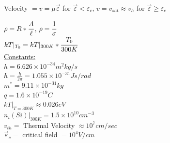\documentclass{article}
\newcommand\tab[1][1cm]{\hspace*{#1}}
\begin{document}
\begin{large}
	\noindent Velocity $= v = \mu \vec{\varepsilon}$ for $\vec{\varepsilon} < \varepsilon_c$, \tab 
	$v = v_{sat} \approx v_h$ for $\vec{\varepsilon} \geq \varepsilon_c$
	
	\noindent $\rho = R*\cfrac{A}{\ell}$, \tab $\rho = \cfrac{1}{\sigma}$\\
	
	\noindent $kT|_{T_0} = kT|_{300K} * \cfrac{T_0}{300K}$\\
	
	\noindent \underline{Constants:} \\
	$h = 6.626 \times 10^{-34} m^2 kg / s$\\
	$\hbar = \frac{h}{2\pi} = 1.055 \times 10^{-31} Js/rad$\\ 
	$m^* = 9.11 \times 10^{-31} kg$\\
	$q = 1.6 \times 10^{-19} C$\\
	$kT|_{T=300K} \approx 0.026eV$ \\
	$n_i(Si)|_{300K} = 1.5 \times 10^{10} cm^{-3}$\\
	$v_{th} =$ Thermal Velocity $\approx 10^7 cm/sec$ \\
	$\vec{\varepsilon}_c =$ critical field $= 10^4 V/cm$\\\\
	

\end{large}
\end{document}
